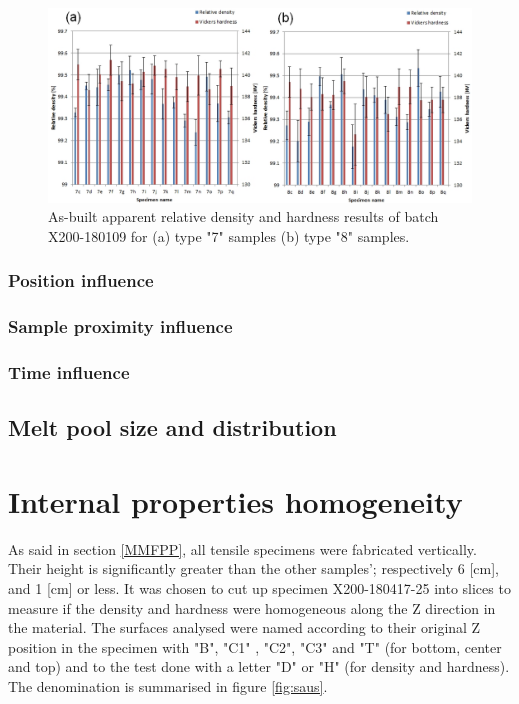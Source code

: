 \begin{figure}[ht]
\centering
\centerline{\includegraphics[scale=0.65]{Images/HD-180109-both}}
\decoRule
\caption[As-built apparent relative density and hardness results of batch X200-180109 for (a) type "7" samples (b) type "8" samples.]{As-built apparent relative density and hardness results of batch X200-180109 for (a) type "7" samples (b) type "8" samples.}
\label{fig:HD-171024}
\end{figure} 



\subsubsection{Position influence}


\subsubsection{Sample proximity influence}

\subsubsection{Time influence}

\subsection{Melt pool size and distribution}

\section{Internal properties homogeneity}
As said in section \ref{MMFPP}, all tensile specimens were fabricated vertically. Their height is significantly greater than the other samples'; respectively 6 [cm], and 1 [cm] or less. It was chosen to cut up specimen X200-180417-25 into slices to measure if the density and hardness were homogeneous along the Z direction in the material. The surfaces analysed were named according to their original Z position in the specimen with "B", "C1" , "C2", "C3" and "T" (for bottom, center and top) and to the test done with a letter "D" or "H"  (for density and hardness). The denomination is summarised in figure \ref{fig:saus}.\\

